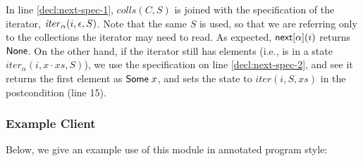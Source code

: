 In line \ref{decl:next-spec-1}, $\mathit{colls}(C, S)$ is joined with 
the specification of the iterator, $\mathit{iter}_\alpha(i, \epsilon, S)$. Note
that the same $S$ is used, so that we are referring only to the collections
the iterator may need to read.  As expected, $\mathsf{next}[\alpha](i)$ returns 
$\mathsf{None}$.  On the other hand, if the iterator still has elements (i.e., is in a state
$iter_\alpha(i, x\cdot xs, S)$), we use the specification on line \ref{decl:next-spec-2}, 
and see it returns the first element as
$\mathsf{Some}\;x$, and sets the state to $iter(i, S, xs)$ in the
postcondition (line 15). 

\subsubsection{Example Client}

Below, we give an example use of this module in annotated program
style: 

